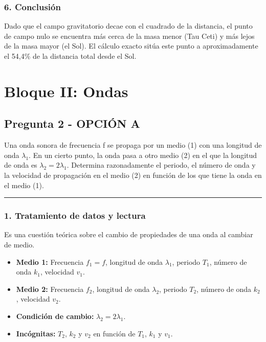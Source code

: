 \subsubsection*{6. Conclusión}
\begin{cajaconclusion}
Dado que el campo gravitatorio decae con el cuadrado de la distancia, el punto de campo nulo se encuentra más cerca de la masa menor (Tau Ceti) y más lejos de la masa mayor (el Sol). El cálculo exacto sitúa este punto a aproximadamente el 54,4\% de la distancia total desde el Sol.
\end{cajaconclusion}

\newpage

\section{Bloque II: Ondas}
\label{sec:ondas_2018_jun_ord}

\subsection{Pregunta 2 - OPCIÓN A}
\label{subsec:2A_2018_jun_ord}
\begin{cajaenunciado}
Una onda sonora de frecuencia f se propaga por un medio (1) con una longitud de onda $\lambda_{1}$. En un cierto punto, la onda pasa a otro medio (2) en el que la longitud de onda es $\lambda_{2}=2\lambda_{1}$. Determina razonadamente el periodo, el número de onda y la velocidad de propagación en el medio (2) en función de los que tiene la onda en el medio (1).
\end{cajaenunciado}
\hrule

\subsubsection*{1. Tratamiento de datos y lectura}
Es una cuestión teórica sobre el cambio de propiedades de una onda al cambiar de medio.
\begin{itemize}
    \item \textbf{Medio 1:} Frecuencia $f_1=f$, longitud de onda $\lambda_1$, periodo $T_1$, número de onda $k_1$, velocidad $v_1$.
    \item \textbf{Medio 2:} Frecuencia $f_2$, longitud de onda $\lambda_2$, periodo $T_2$, número de onda $k_2$, velocidad $v_2$.
    \item \textbf{Condición de cambio:} $\lambda_2 = 2\lambda_1$.
    \item \textbf{Incógnitas:} $T_2$, $k_2$ y $v_2$ en función de $T_1$, $k_1$ y $v_1$.
\end{itemize}

